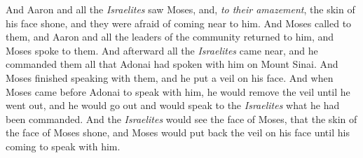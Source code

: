\begin{biblechapter}
\verse And Aaron and all the \textit{Israelites} saw Moses, and, \textit{to their amazement}, the skin of his face shone, and they were afraid of coming near to him.
\verse And Moses called to them, and Aaron and all the leaders of the community returned to him, and Moses spoke to them.
\verse And afterward all the \textit{Israelites} came near, and he commanded them all that Adonai had spoken with him on Mount Sinai.
\verse And Moses finished speaking with them, and he put a veil on his face.
\verse And when Moses came before Adonai to speak with him, he would remove the veil until he went out, and he would go out and would speak to the \textit{Israelites} what he had been commanded.
\verse And the \textit{Israelites} would see the face of Moses, that the skin of the face of Moses shone, and Moses would put back the veil on his face until his coming to speak with him.
\end{biblechapter}

